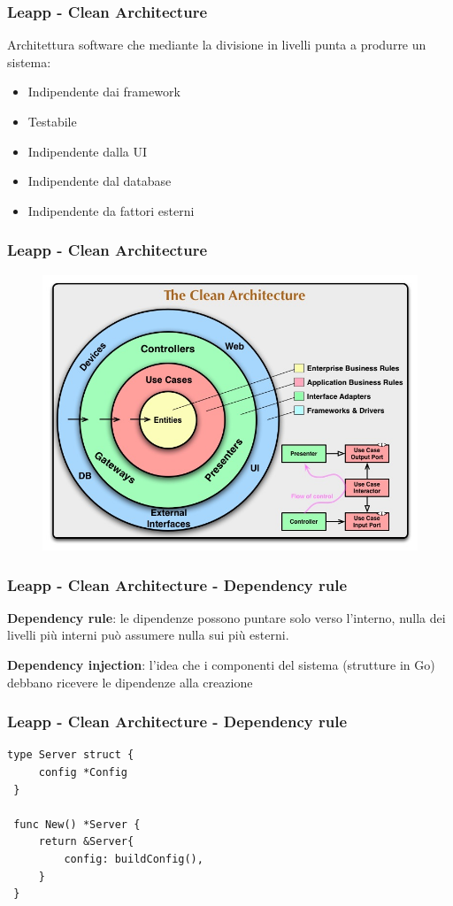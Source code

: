 \documentclass{beamer}
\begin{document}
\begin{frame}
 \frametitle{Leapp - Clean Architecture}
 Architettura software che mediante la divisione in livelli punta a produrre un sistema:
 \begin{itemize}
  \item Indipendente dai framework
  \item Testabile
  \item Indipendente dalla UI
  \item Indipendente dal database
  \item Indipendente da fattori esterni
 \end{itemize}
\end{frame}

\begin{frame}
 \frametitle{Leapp - Clean Architecture}
 \begin{figure}
   \centering
   \includegraphics[width=1\textwidth]{Risorse/CleanArchitecture.jpg}
  \end{figure}
\end{frame}

\begin{frame}[fragile]
 \frametitle{Leapp - Clean Architecture - Dependency rule}
 \textbf{Dependency rule}: le dipendenze possono puntare solo verso l’interno, nulla dei livelli più interni può assumere nulla sui più esterni.
 \pause

 \textbf{Dependency injection}: l’idea che i componenti del sistema (strutture in Go) debbano ricevere le dipendenze alla creazione
\end{frame}

\begin{frame}[fragile]
 \frametitle{Leapp - Clean Architecture - Dependency rule}
 \begin{lstlisting}[style=customgo, caption=esempio di Dependency Injection, captionpos=b]
 type Server struct {
     config *Config
 }

 func New() *Server {
     return &Server{
         config: buildConfig(),
     }
 }
 \end{lstlisting}
\end{frame}
\end{document}
